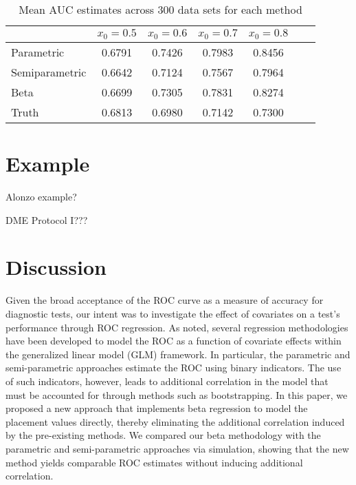 \documentclass{interact}
\theoremstyle{definition}
\begin{document}
\begin{table}[!th]
\begin{center}
\begin{tabular}{lcccccc}
  \hline
 & $x_0 = 0.5$ & $x_0 = 0.6$ & $x_0 = 0.7$ & $x_0 = 0.8$ \\ 
  \hline
Parametric & 0.6791 & 0.7426 & 0.7983 & 0.8456 \\ 
Semiparametric & 0.6642 & 0.7124 & 0.7567 & 0.7964 \\ 
Beta & 0.6699 & 0.7305 & 0.7831 & 0.8274 \\ 
Truth & 0.6813 & 0.6980 & 0.7142 & 0.7300 \\
   \hline
\end{tabular}
\caption{Mean AUC estimates across 300 data sets for each method}
\end{center}
\end{table}






\section{Example}
{\color{red} Alonzo example?

DME Protocol I???}

\section{Discussion}

   Given the broad acceptance of the ROC curve as a measure of accuracy for diagnostic tests, our intent was to investigate the effect of covariates on a test's performance through ROC regression.  As noted, several regression methodologies have been developed to model the ROC as a function of covariate effects within the generalized linear model (GLM) framework.  In particular, the parametric and semi-parametric approaches estimate the ROC using binary indicators.  The use of such indicators, however, leads to additional correlation in the model that must be accounted for through methods such as bootstrapping.  In this paper, we proposed a new approach that implements beta regression to model the placement values directly, thereby eliminating the additional correlation induced by the pre-existing methods. We compared our beta methodology with the parametric and semi-parametric approaches via simulation, showing that the new method yields comparable ROC estimates without inducing additional correlation.  
   
\end{document}
